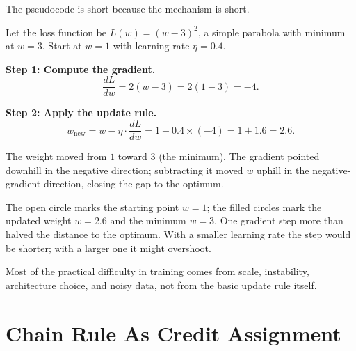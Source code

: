 The pseudocode is short because the mechanism is short.

\begin{example}
Let the loss function be \(L(w) = (w - 3)^2\), a simple parabola with minimum at \(w = 3\). Start at \(w = 1\) with learning rate \(\eta = 0.4\).

\textbf{Step 1: Compute the gradient.}
\[
\frac{dL}{dw} = 2(w - 3) = 2(1 - 3) = -4.
\]

\textbf{Step 2: Apply the update rule.}
\[
w_{\text{new}} = w - \eta \cdot \frac{dL}{dw} = 1 - 0.4 \times (-4) = 1 + 1.6 = 2.6.
\]

The weight moved from \(1\) toward \(3\) (the minimum). The gradient pointed downhill in the negative direction; subtracting it moved \(w\) uphill in the negative-gradient direction, closing the gap to the optimum.

\begin{center}
\end{center}

The open circle marks the starting point \(w=1\); the filled circles mark the updated weight \(w=2.6\) and the minimum \(w=3\). One gradient step more than halved the distance to the optimum. With a smaller learning rate the step would be shorter; with a larger one it might overshoot.
\end{example} Most of the practical difficulty in training comes from scale, instability, architecture choice, and noisy data, not from the basic update rule itself.

\section*{Chain Rule As Credit Assignment}

